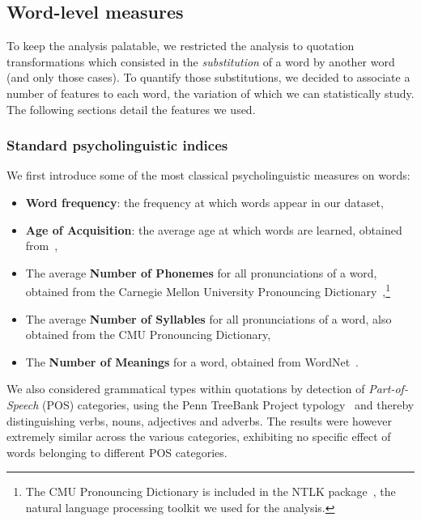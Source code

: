 \subsection{Word-level measures}

To keep the analysis palatable, we restricted the analysis to quotation transformations which consisted in the \emph{substitution} of a word by another word (and only those cases).
To quantify those substitutions, we decided to associate a number of features to each word, the variation of which we can statistically study.
The following sections detail the features we used.

\subsubsection{Standard psycholinguistic indices}

We first introduce some of the most classical psycholinguistic measures on words:


\begin{itemize}
    \item \textbf{Word frequency}: the frequency at which words appear in our dataset, 
    \item \textbf{Age of Acquisition}: the average age at which words are learned, obtained from~\citet{kuperman12},
    \item The average \textbf{Number of Phonemes} for all pronunciations of a word, obtained from the Carnegie Mellon University Pronouncing Dictionary~\citep{Weide98},\footnote{The CMU Pronouncing Dictionary is included in the NTLK package~\citep{Bird09}, the natural language processing toolkit we used for the analysis.}
    \item The average \textbf{Number of Syllables} for all pronunciations of a word, also obtained from the CMU Pronouncing Dictionary,
    \item The \textbf{Number of Meanings} for a word, obtained from WordNet~\citep{WordNet10}. 
\end{itemize}

We also considered grammatical types within quotations by detection of \emph{Part-of-Speech} (POS) categories, using the Penn TreeBank Project typology~\citep{Santorini90} and thereby distinguishing verbs, nouns, adjectives and adverbs.
The results were however extremely similar across the various categories, exhibiting no specific effect of words belonging to different POS categories.

